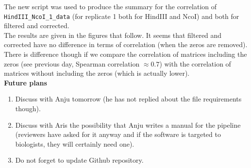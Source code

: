 \documentclass[idxtotoc,hyperref,openany]{labbook} %
\newcommand{\HRule}{\rule{\linewidth}{0.5mm}} %
\begin{document}
The new script was used to produce the summary for the correlation of \texttt{HindIII\_NcoI\_1\_data} (for replicate 1 both for HindIII and NcoI) and both for filtered and corrected.\\

	

The results are given in the figures that follow. It seems that filtered and corrected have no difference in terms of correlation (when the zeros are removed). There is difference though if we compare the correlation of matrices including the zeros (see previous day, Spearman correlation $\approx 0.7$) with the correlation of matrices without including the zeros (which is actually lower).\\ 

\textbf{Future plans}

\begin{enumerate}
	\item Discuss with Anju tomorrow (he has not replied about the file requirements though).
	\item Discuss with Aris the possibility that Anju writes a manual for 
	the pipeline (reviewers have asked for it anyway and if the software
	is targeted to biologists, they will certainly need one).
	\item Do not forget to update Github repository. 
\end{enumerate}









\end{document}
